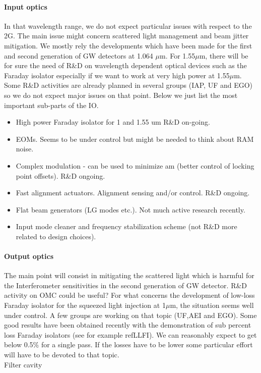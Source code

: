 \paragraph{Input optics}
In that wavelength range, we do not expect particular issues with respect to the 2G. The main issue might concern scattered light management and beam jitter mitigation.
We mostly rely the developments which have been made for the first and second generation of GW detectors at 1.064 $\mu$m. For 1.55$\mu$m, there will be for sure the need of R\&D on wavelength dependent optical devices such as the Faraday isolator especially if we want to work at very high power at 1.55$\mu$m. Some R\&D activities are already planned in several groups (IAP, UF and EGO) so we do not expect major issues on that point.
Below we just list the most important sub-parts of the IO.
\begin{itemize}
\item	High power Faraday isolator for 1 and 1.55 um R\&D on-going.
\item	EOMs. Seems to be under control but might be needed to think about RAM noise.
\item	Complex modulation - can be used to minimize am (better control of locking point offsets). R\&D ongoing.
\item	Fast alignment actuators. Alignment sensing and/or control. R\&D ongoing.
\item	Flat beam generators (LG modes etc.). Not much active research recently.
\item	Input mode cleaner and frequency stabilization scheme (not R\&D more related to design choices). 
\end{itemize}
\paragraph{Output optics}
The main point will consist in mitigating the scattered light which is harmful for the Interferometer sensitivities in the second generation of GW detector.
R\&D activity on OMC could be useful?
For what concerns the development of low-loss Faraday isolator for the squeezed light injection at 1$\mu$m, the situation seems well under control. A few groups are working on that topic (UF,AEI and EGO). Some good results have been obtained recently with the demonstration of sub percent loss Faraday isolators (see for example refLLFI). We can reasonably expect to get below 0.5\% for a single pass. If the losses have to be lower some particular effort will have to be devoted to that topic.\\ 
Filter cavity

